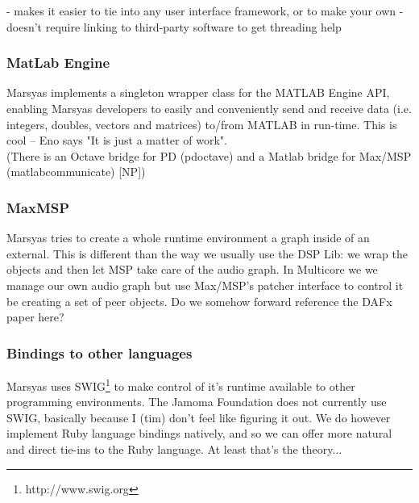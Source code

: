 \documentclass[twoside,10pt]{article}
\begin{document}
- makes it easier to tie into any user interface framework, or to make your own
- doesn't require linking to third-party software to get threading help

\subsubsection{MatLab Engine}

Marsyas implements a singleton wrapper class for the MATLAB Engine API, enabling Marsyas developers to easily and conveniently send and receive data (i.e. integers, doubles, vectors and matrices) to/from MATLAB in run-time.  This is cool -- Eno says "It is just a matter of work".   \\
(There is an Octave bridge for PD (pdoctave) and a Matlab bridge for Max/MSP (matlabcommunicate) [NP])

\subsubsection{MaxMSP}

Marsyas tries to create a whole runtime environment a graph inside of an external.  This is different than the way we usually use the DSP Lib: we wrap the objects and then let MSP take care of the audio graph.  In Multicore we we manage our own audio graph but use Max/MSP's patcher interface to control it be creating a set of peer objects.  Do we somehow forward reference the DAFx paper here?

\subsubsection{Bindings to other languages}

Marsyas uses SWIG\footnote{http://www.swig.org} to make control of it's runtime available to other programming environments.  The Jamoma Foundation does not currently use SWIG, basically because I (tim) don't feel like figuring it out.  We do however implement Ruby language bindings natively, and so we can offer more natural and direct tie-ins to the Ruby language.  At least that's the theory...


\end{document}
